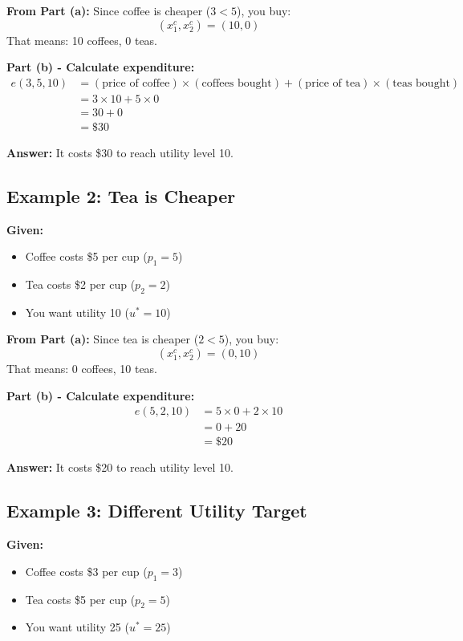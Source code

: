 \documentclass[11pt]{article}
\begin{document}
\textbf{From Part (a):} Since coffee is cheaper ($3 < 5$), you buy:
$$(x_1^c, x_2^c) = (10, 0)$$
That means: 10 coffees, 0 teas.

\textbf{Part (b) - Calculate expenditure:}
\begin{align*}
e(3, 5, 10) &= (\text{price of coffee}) \times (\text{coffees bought}) + (\text{price of tea}) \times (\text{teas bought}) \\
&= 3 \times 10 + 5 \times 0 \\
&= 30 + 0 \\
&= \$30
\end{align*}

\textbf{Answer:} It costs \$30 to reach utility level 10.

\subsection{Example 2: Tea is Cheaper}

\textbf{Given:}
\begin{itemize}
\item Coffee costs \$5 per cup ($p_1 = 5$)
\item Tea costs \$2 per cup ($p_2 = 2$)
\item You want utility 10 ($u^* = 10$)
\end{itemize}

\textbf{From Part (a):} Since tea is cheaper ($2 < 5$), you buy:
$$(x_1^c, x_2^c) = (0, 10)$$
That means: 0 coffees, 10 teas.

\textbf{Part (b) - Calculate expenditure:}
\begin{align*}
e(5, 2, 10) &= 5 \times 0 + 2 \times 10 \\
&= 0 + 20 \\
&= \$20
\end{align*}

\textbf{Answer:} It costs \$20 to reach utility level 10.

\subsection{Example 3: Different Utility Target}

\textbf{Given:}
\begin{itemize}
\item Coffee costs \$3 per cup ($p_1 = 3$)
\item Tea costs \$5 per cup ($p_2 = 5$)
\item You want utility 25 ($u^* = 25$)
\end{itemize}
\end{document}
